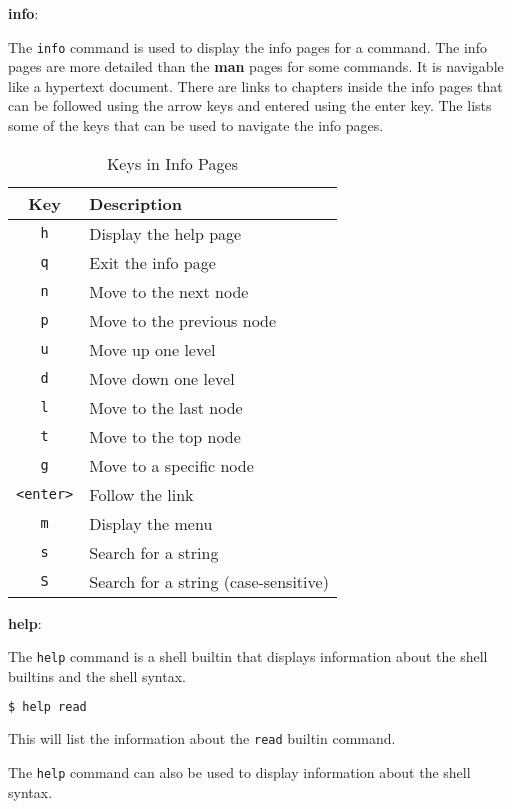 \textbf{info}:

The \lstinline|info| command is used to display the info pages for a command.
The info pages are more detailed than the \textbf{man} pages for some commands.
It is navigable like a hypertext document.
There are links to chapters inside the info pages that can be followed using the arrow keys and entered using the enter key.
The  lists some of the keys that can be used to navigate the info pages.

\begin{table}[h!]
\caption{Keys in Info Pages}
\begin{tabular}{ c l }
  \toprule
 Key & Description \\
 \midrule
  \lstinline|h| & Display the help page \\
  \lstinline|q| & Exit the info page \\
  \lstinline|n| & Move to the next node \\
  \lstinline|p| & Move to the previous node \\
  \lstinline|u| & Move up one level \\
  \lstinline|d| & Move down one level \\
  \lstinline|l| & Move to the last node \\
  \lstinline|t| & Move to the top node \\
  \lstinline|g| & Move to a specific node \\
  \lstinline|<enter>| & Follow the link \\
  \lstinline|m| & Display the menu \\
  \lstinline|s| & Search for a string \\
  \lstinline|S| & Search for a string (case-sensitive) \\
  \bottomrule
\end{tabular}
\end{table}

\textbf{help}:

The \lstinline|help| command is a shell builtin that displays information about the shell builtins and the shell syntax.

\begin{lstlisting}[language=bash]
$ help read
\end{lstlisting}

This will list the information about the \lstinline|read| builtin command.

The \lstinline|help| command can also be used to display information about the shell syntax.

